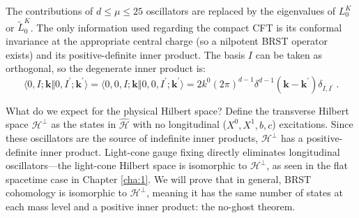 The contributions of $d \leq \mu \leq 25$ oscillators are replaced by the eigenvalues of $L_{0}^{K}$ or $\tilde{L}_{0}^{K}$. The only information used regarding the compact CFT is its conformal invariance at the appropriate central charge (so a nilpotent BRST operator exists) and its positive-definite inner product. The basis $I$ can be taken as orthogonal, so the degenerate inner product is:
\begin{equation}
\langle 0, I ; \mathbf{k} \Vert 0, I^{\prime} ; \mathbf{k}^{\prime}\rangle= \langle 0,0, I ; \mathbf{k} \Vert 0,0, I^{\prime} ; \mathbf{k}^{\prime}\rangle=2 k^{0}(2 \pi)^{d-1} \delta^{d-1} (\mathbf{k}-\mathbf{k}^{\prime}) \delta_{I, I^{\prime}} \:. \label{4.4.5}
\end{equation}

What do we expect for the physical Hilbert space? Define the transverse Hilbert space $\mathscr{H}^{\perp}$ as the states in $\hat{\mathscr{H}}$ with no longitudinal ($X^{0}, X^{1}, b,c$) excitations. Since these oscillators are the source of indefinite inner products, $\mathscr{H}^{\perp}$ has a positive-definite inner product. Light-cone gauge fixing directly eliminates longitudinal oscillators—the light-cone Hilbert space is isomorphic to $\mathscr{H}^{\perp}$, as seen in the flat spacetime case in Chapter \ref{cha:1}. We will prove that in general, BRST cohomology is isomorphic to $\mathscr{H}^{\perp}$, meaning it has the same number of states at each mass level and a positive inner product: the no-ghost theorem.

